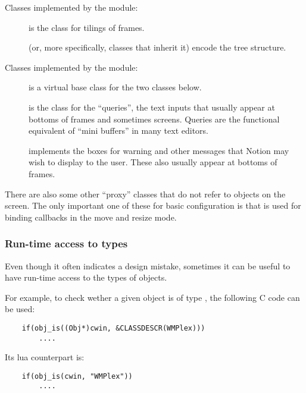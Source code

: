 Classes implemented by the  module:

\begin{description}
  \item[] is the class for tilings
    of frames.
  \item[] (or, more specifically, classes
    that inherit it) encode the  tree structure.
\end{description}


Classes implemented by the  module:

\begin{description}
  \item[] is a virtual base class for the
    two classes below.
  \item[] is the class for the ``queries'',
    the text inputs that usually appear at bottoms of frames and sometimes
    screens. Queries are the functional equivalent of ``mini buffers'' in
    many text editors.
  \item[] implements the boxes for 
    warning and other messages that Notion may wish to display to the user. 
    These also usually appear at bottoms of frames.
\end{description}

There are also some other ``proxy'' classes that do not refer
to objects on the screen. The only important one of these for
basic configuration is  that is used for
binding callbacks in the move and resize mode.

\subsubsection{Run-time access to types}

Even though it often indicates a design mistake, sometimes it can be useful to
have run-time access to the types of objects.

For example, to check wether a given object is of type , the 
following C code can be used:

\begin{verbatim}
    if(obj_is((Obj*)cwin, &CLASSDESCR(WMPlex)))
        ....
\end{verbatim}

Its lua counterpart is:

\begin{verbatim}
    if(obj_is(cwin, "WMPlex"))
        ....
\end{verbatim}

